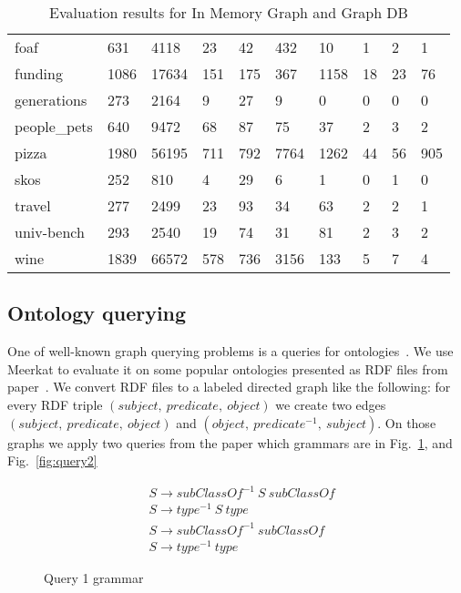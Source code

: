 \begin{table*}[t]
\begin{tabular}{|l|l|llll|llll|}
foaf                        & 631  & 4118  & 23  & 42  & 432  & 10   & 1  & 2  & 1    \\
funding                     & 1086 & 17634 & 151 & 175 & 367  & 1158 & 18 & 23 & 76   \\
generations                 & 273  & 2164  & 9   & 27  & 9    & 0    & 0  & 0  & 0    \\
people\_pets                & 640  & 9472  & 68  & 87  & 75   & 37   & 2  & 3  & 2    \\
pizza                       & 1980 & 56195 & 711 & 792 & 7764 & 1262 & 44 & 56 & 905  \\
skos                        & 252  & 810   & 4   & 29  & 6    & 1    & 0  & 1  & 0    \\
travel                      & 277  & 2499  & 23  & 93  & 34   & 63   & 2  & 2  & 1    \\
univ-bench                  & 293  & 2540  & 19  & 74  & 31   & 81   & 2  & 3  & 2    \\
wine                        & 1839 & 66572 & 578 & 736 & 3156 & 133  & 5  & 7  & 4    \\
\hline
\end{tabular}
\caption{Evaluation results for In Memory Graph and Graph DB}
\label{table:rdfs}
\end{table*}


\subsection{Ontology querying}
\label{sec:ontology}

One of well-known graph querying problems is a queries for ontologies~\cite{FndDB}.
We use Meerkat to evaluate it on some popular ontologies presented as RDF files from paper~\cite{CFGonRDF}. 
We convert RDF files to a labeled directed graph like the following: for every RDF triple $(subject,\ predicate,\ object)$ we create two edges $(subject,\ predicate,\ object)$ and $(object,\ predicate^{-1},\ subject)$.
On those graphs we apply two queries from the paper \cite{GrigorevR16} which grammars are in Fig.~\ref{fig:query1}, and Fig.~\ref{fig:query2} 
\begin{figure}[h]
\begin{align*}
& S \rightarrow subClassOf^{-1}\ S\ subClassOf\\
& S \rightarrow type^{-1}\ S\ type\\
& S \rightarrow subClassOf^{-1}\ subClassOf\\
& S \rightarrow type^{-1}\ type
\end{align*}
\caption{Query 1 grammar}
\label{fig:query1}
\end{figure}

